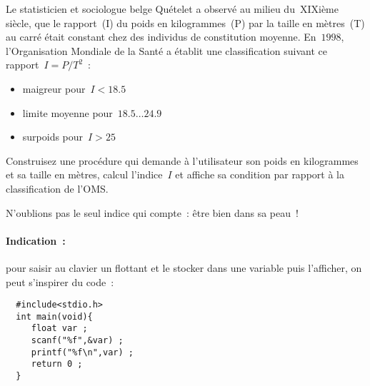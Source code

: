 \begin{exercice}
  Le statisticien et sociologue belge Qu\'etelet a observ\'e au milieu
  du~XIXi\`eme    si\`ecle,   que  le      rapport~(I)  du poids    en
  kilogrammes~(P) par la taille   en m\`etres~(T) au   carr\'e \'etait
  constant chez   des individus de   constitution moyenne.  En~$1998$,
  l'Organisation Mondiale de la Sant\'e a \'etablit une classification
  suivant ce rapport~${I=P/T^{2}}$~:
  \begin{itemize}
  \item maigreur pour~${I<18.5}$
  \item limite moyenne pour~${18.5 \ldots 24.9}$
  \item surpoids pour~${I>25}$
  \end{itemize}
  \par
  Construisez une proc\'edure qui demande  \`a l'utilisateur son poids
  en  kilogrammes  et sa  taille en m\`etres,   calcul l'indice~$I$ et
  affiche sa condition par rapport \`a la classification de l'OMS.
  \par
  N'oublions pas le seul indice qui compte~: \^etre bien dans sa peau~!
  \ifcorrection
  \begin{correction}
    
  \end{correction}
  \fi
  \paragraph{Indication~:} pour saisir au clavier un flottant et le stocker 
  dans une variable puis l'afficher, on peut s'inspirer du code~:
  \begin{verbatim}
  #include<stdio.h>
  int main(void){
     float var ;
     scanf("%f",&var) ;
     printf("%f\n",var) ;
     return 0 ;
  }
  \end{verbatim}
\end{exercice}

